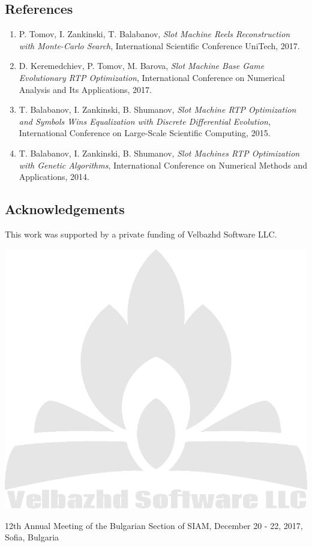 \documentclass[a0,portrait,25pt]{sciposter}
\begin{document}
\begin{multicols}{3}
\begin{mdframed}[backgroundcolor=white,roundcorner=4pt,shadow=true,linewidth=1pt]
\color{Black}
\section*{References}
\begin{enumerate}
\item P. Tomov, I. Zankinski, T. Balabanov, \textit{Slot Machine Reels Reconstruction with Monte-Carlo Search}, International Scientific Conference UniTech, 2017.
\item D. Keremedchiev, P. Tomov, M. Barova, \textit{Slot Machine Base Game Evolutionary RTP Optimization}, International Conference on Numerical Analysis and Its Applications, 2017.
\item T. Balabanov, I. Zankinski, B. Shumanov, \textit{Slot Machine RTP Optimization and Symbols Wins Equalization with Discrete Differential Evolution}, International Conference on Large-Scale Scientific Computing, 2015.
\item T. Balabanov, I. Zankinski, B. Shumanov, \textit{Slot Machines RTP Optimization with Genetic Algorithms}, International Conference on Numerical Methods and Applications, 2014.
\end{enumerate}
\end{mdframed}

\begin{mdframed}[backgroundcolor=white,roundcorner=4pt,shadow=true,linewidth=1pt]
\section*{Acknowledgements}
This work was supported by a private funding of Velbazhd Software LLC. 

\includegraphics[width=0.9\linewidth]{veld_soft_camp_fire_logo}
\end{mdframed}
\end{multicols}

\begin{mdframed}[backgroundcolor=white,roundcorner=4pt,shadow=true,linewidth=1pt]
\color{Black}
12th Annual Meeting of the Bulgarian Section of SIAM, December 20 - 22, 2017, Sofia, Bulgaria
\end{mdframed}
\end{document}
